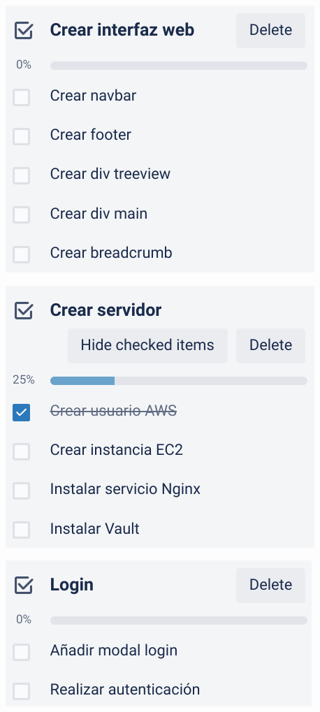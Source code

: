 \documentclass{\ClassPath/viu-tfm-template}
\begin{document}
{
    \begin{minipage}{0.32\linewidth}
        \includegraphics[width=\linewidth]{img/tarea1.png}
    \end{minipage}
    \hfill
    \begin{minipage}{0.32\linewidth}
        \includegraphics[width=\linewidth]{img/tarea2.png}
    \end{minipage}
    \hfill
    \begin{minipage}{0.32\linewidth}
        \includegraphics[width=\linewidth]{img/tarea3.png}
    \end{minipage}
}
\end{document}
